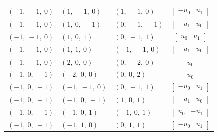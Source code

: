 \documentclass[11pt]{article}
\theoremstyle{definition}
\begin{document}
\begin{longtable}{|l|l|l|c|}
    \hline
    $\left( -1, \  -1, \  0\right)$ & $\left( 1, \  -1, \  0\right)$ & $\left( 1, \  -1, \  0\right)$ & $\left[\begin{matrix}- u_{0} & u_{1}\end{matrix}\right]$ \\
    \hline
    $\left( -1, \  -1, \  0\right)$ & $\left( 1, \  0, \  -1\right)$ & $\left( 0, \  -1, \  -1\right)$ & $\left[\begin{matrix}- u_{1} & u_{0}\end{matrix}\right]$ \\
    \hline
    $\left( -1, \  -1, \  0\right)$ & $\left( 1, \  0, \  1\right)$ & $\left( 0, \  -1, \  1\right)$ & $\left[\begin{matrix}u_{0} & u_{1}\end{matrix}\right]$ \\
    \hline
    $\left( -1, \  -1, \  0\right)$ & $\left( 1, \  1, \  0\right)$ & $\left( -1, \  -1, \  0\right)$ & $\left[\begin{matrix}- u_{1} & u_{0}\end{matrix}\right]$ \\
    \hline
    $\left( -1, \  -1, \  0\right)$ & $\left( 2, \  0, \  0\right)$ & $\left( 0, \  -2, \  0\right)$ & $u_{0}$ \\
    \hline
    $\left( -1, \  0, \  -1\right)$ & $\left( -2, \  0, \  0\right)$ & $\left( 0, \  0, \  2\right)$ & $u_{0}$ \\
    \hline
    $\left( -1, \  0, \  -1\right)$ & $\left( -1, \  -1, \  0\right)$ & $\left( 0, \  -1, \  1\right)$ & $\left[\begin{matrix}- u_{0} & u_{1}\end{matrix}\right]$ \\
    \hline
    $\left( -1, \  0, \  -1\right)$ & $\left( -1, \  0, \  -1\right)$ & $\left( 1, \  0, \  1\right)$ & $\left[\begin{matrix}- u_{1} & u_{0}\end{matrix}\right]$ \\
    \hline
    $\left( -1, \  0, \  -1\right)$ & $\left( -1, \  0, \  1\right)$ & $\left( -1, \  0, \  1\right)$ & $\left[\begin{matrix}u_{0} & - u_{1}\end{matrix}\right]$ \\
    \hline
    $\left( -1, \  0, \  -1\right)$ & $\left( -1, \  1, \  0\right)$ & $\left( 0, \  1, \  1\right)$ & $\left[\begin{matrix}- u_{0} & u_{1}\end{matrix}\right]$ \\

\end{longtable}
\end{document}
